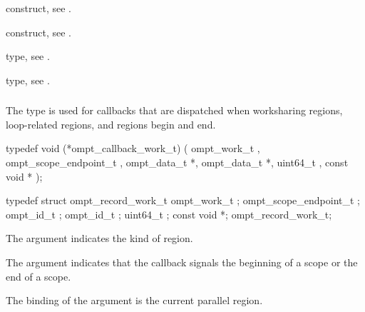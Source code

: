 \begin{crossrefs}
\item {} construct, see .

\item {} construct, see .

\item {} type, see .

\item {} type, 
see .
\end{crossrefs}



\subsubsection{}
\label{sec:ompt_callback_work_t}
\summary
The  type is used for callbacks that
are dispatched when worksharing regions, loop-related regions, 
and  regions begin and end.

\format
\begin{ccppspecific}
\begin{omptCallback}
typedef void (*ompt_callback_work_t) (
  ompt_work_t ,
  ompt_scope_endpoint_t ,
  ompt_data_t *,
  ompt_data_t *,
  uint64_t ,
  const void *
);
\end{omptCallback}
\end{ccppspecific}

\record
\begin{ccppspecific}
\begin{omptRecord}
typedef struct ompt_record_work_t {
  ompt_work_t ;
  ompt_scope_endpoint_t ;
  ompt_id_t ;
  ompt_id_t ;
  uint64_t ;
  const void *;
} ompt_record_work_t;
\end{omptRecord}
\end{ccppspecific}

\argdesc
The  argument indicates the kind of region.

The  argument indicates that the callback signals
the beginning of a scope or the end of a scope.

The binding of the  argument is the current parallel region.

